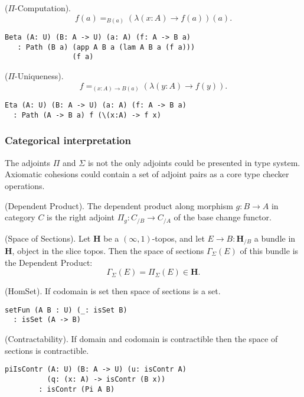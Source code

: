 \documentclass{article}
\begin{document}
\begin{theorem} ($\Pi$-Computation).
$$f(a) =_{B(a)} (\lambda (x:A) \rightarrow f(a))(a).$$
\begin{lstlisting}
Beta (A: U) (B: A -> U) (a: A) (f: A -> B a)
   : Path (B a) (app A B a (lam A B a (f a)))
                (f a)
\end{lstlisting}
\end{theorem}

\begin{theorem} ($\Pi$-Uniqueness).
$$f =_{(x:A)\rightarrow B(a)} (\lambda (y:A) \rightarrow f(y)).$$
\begin{lstlisting}
Eta (A: U) (B: A -> U) (a: A) (f: A -> B a)
  : Path (A -> B a) f (\(x:A) -> f x)
\end{lstlisting}
\end{theorem}

\subsubsection*{Categorical interpretation}

The adjoints $\Pi$ and $\Sigma$ is not the only adjoints could be presented in type system.
Axiomatic cohesions could contain a set of adjoint pairs as a core type checker operations.

\begin{definition} (Dependent Product).
The dependent product along morphism $g: B \rightarrow A$ in category $C$ is the right
adjoint $\Pi_g : C_{/B} \rightarrow C_{/A}$ of the base change functor.
\end{definition}

\begin{definition} (Space of Sections).
Let $\mathbf{H}$ be a $(\infty,1)$-topos, and let $E \rightarrow B : \mathbf{H}_{/B}$ a bundle in
$\mathbf{H}$, object in the slice topos. Then the space of sections $\Gamma_\Sigma(E)$
of this bundle is the Dependent Product:
$$ \Gamma_\Sigma(E) = \Pi_\Sigma (E) \in \mathbf{H}. $$
\end{definition}

\begin{theorem} (HomSet).
If codomain is set then space of sections is a set.
\begin{lstlisting}
setFun (A B : U) (_: isSet B)
  : isSet (A -> B)
\end{lstlisting}
\end{theorem}

\begin{theorem} (Contractability).
If domain and codomain is contractible then the space of sections is contractible.
\begin{lstlisting}
piIsContr (A: U) (B: A -> U) (u: isContr A)
          (q: (x: A) -> isContr (B x))
        : isContr (Pi A B)
\end{lstlisting}
\end{theorem}
\end{document}
